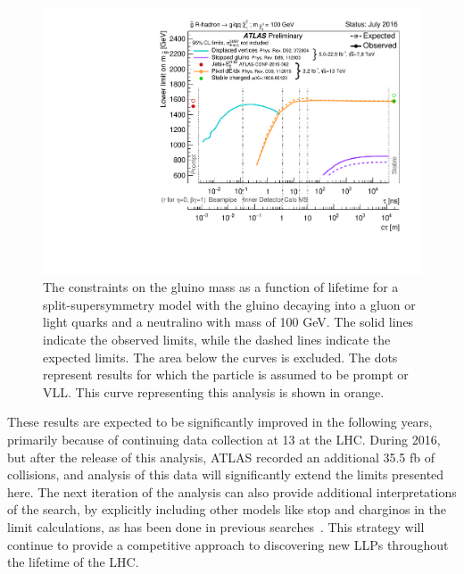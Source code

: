 \begin{figure}[htbp]
\centering
\includegraphics[width=\fullfig]{figures/combined_rhadrons.pdf}  
\caption{The constraints on the gluino mass as a function of lifetime for a split-supersymmetry model with the gluino \rhadrons decaying into a gluon or light quarks and a neutralino with mass of 100 GeV. The solid lines indicate the observed limits, while the dashed lines indicate the expected limits. The area below the curves is excluded. The dots represent results for which the particle is assumed to be prompt or \acs*{VLL}. This curve representing this analysis is shown in orange.}
\label{fig:combined_rhadrons}
\end{figure}

These results are expected to be significantly improved in the following years, primarily because of continuing data collection at 13 \TeV at the \ac{LHC}.
During 2016, but after the release of this analysis, ATLAS recorded an additional 35.5 fb of collisions, and analysis of this data will significantly extend the limits presented here.
The next iteration of the analysis can also provide additional interpretations of the search, by explicitly including other models like stop \rhadrons and charginos in the limit calculations, as has been done in previous searches~\cite{SUSY-2014-09}.
This strategy will continue to provide a competitive approach to discovering new \acp{LLP} throughout the lifetime of the \ac{LHC}.
